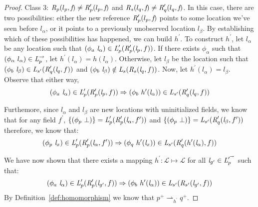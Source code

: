 \begin{proof}
Class 3: $\emph{R}_{p} ( l_{p},  \emph{f}) \neq \emph{R}_{p}^\prime ( l_{p},  \emph{f})$ and $\emph{R}_{s} ( l_{q},  \emph{f}) \neq \emph{R}_{q}^\prime ( l_{q},  \emph{f})$. In this case, there are two possibilities: either the new reference $\emph{R}_{p}^\prime ( l_{p},  \emph{f})$ points to some location we've seen before $l_\alpha$, or it points to a previously unobserved location $l_\beta$. By establishing which of these possibilities has happened, we can build $h^\prime$. To construct $h^\prime$, let $l_\alpha$ be any location such that $(\phi_a\ \cfgnt{l}_\alpha) \in \cfgnt{L}_{p}^\prime(\cfgnt{R}_{p}^\prime (\cfgnt{l}_{p},f )) $. If there exists $\phi_\alpha$ such that $( \phi_\alpha\ l_\alpha ) \in \emph{L}_{p}^\rightarrow $, let $h^\prime(l_\alpha) = h(l_\alpha)$. Otherwise, let $l_\beta$ be the location such that $(\phi_b\ \cfgnt{l}_\beta) \in \cfgnt{L}_{s^\prime}(\cfgnt{R}_{q}^\prime (\cfgnt{l}_{q},f )) $ and $(\phi_b\ \cfgnt{l}_\beta) \notin \cfgnt{L}_{s}(\cfgnt{R}_{s} (\cfgnt{l}_{q},f )) $. Now, let $h^\prime(l_\alpha) = l_\beta$. Observe that either way,
$$(\phi_a\ \cfgnt{l}_\alpha) \in \cfgnt{L}_{p}^\prime(\cfgnt{R}_{p}^\prime (\cfgnt{l}_{p},f )) \Rightarrow (\phi_b\ h^\prime (\cfgnt{l}_\alpha))\in \cfgnt{L}_{s^\prime}(\cfgnt{R}_{q}^\prime (\cfgnt{l}_{q},f ))$$

Furthemore, since $l_\alpha$ and $l_\beta$ are new locations with uninitialized fields, we know that for any field $f^\prime$, $\{(\phi_p\ \bot)\} = \emph{L}_{p}^\prime(\emph{R}_{p}^\prime (\emph{l}_\alpha,f^\prime ))$ and $ \{(\phi_p\ \bot)\} = \emph{L}_{s^\prime}(\emph{R}_{q}^\prime (\emph{l}_\beta,f^\prime ))$ therefore, we know that:
$$(\phi_p\ \emph{l}_x) \in \emph{L}_{p}^\prime(\emph{R}_{p}^\prime (\emph{l}_\alpha,f^\prime )) \Rightarrow (\phi_q\ h^\prime (\emph{l}_x))\in \emph{L}_{s^\prime}(\emph{R}_{q}^\prime ( h^\prime(\emph{l}_\alpha),f ))$$

We have now shown that there exists a mapping $h^\prime: \mathcal{L} \mapsto \mathcal{L}$ for all $\emph{l}_{g^\prime} \in \emph{L}_{p}^{\prime^\rightarrow}$ such that:
$$ (\phi_a\ \emph{l}_\alpha) \in \emph{L}_{p}^\prime(\emph{R}_{p}^\prime (\emph{l}_{g^\prime},f )) \Rightarrow (\phi_b\ h^\prime (\emph{l}_\alpha))\in \emph{L}_{s^\prime}(\emph{R}_{s^\prime} (\emph{l}_{g^\prime},f )) $$
By Definition~\ref{def:homomorphism} we know that $p^+ \rightharpoonup_{h^\prime} q^+$. 


\end{proof}
